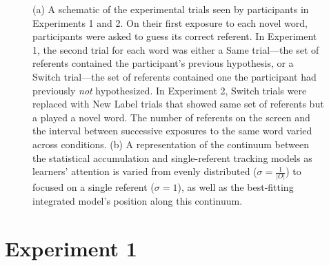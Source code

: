 \documentclass[man,floatsintext]{apa6}
\begin{document}
 \begin{figure}[!h]
	\caption{\label{fig:design} (a)  A schematic of the experimental trials seen by participants in Experiments 1 and 2. On their first exposure to each novel word, participants were asked to guess its correct referent. In Experiment 1, the second trial for each word was either a Same trial---the set of referents contained the participant's previous hypothesis, or a Switch trial---the set of referents contained one the participant had previously \emph{not} hypothesized. In Experiment 2, Switch trials were replaced with New Label trials that showed same set of referents but a played a novel word. The number of referents on the screen and the interval between successive exposures to the same word varied across conditions. (b) A representation of the continuum between the statistical accumulation and single-referent tracking models as learners' attention is varied from evenly distributed ($\sigma=\frac{1}{|O|}$) to focused on a single referent ($\sigma=1$), as well as the best-fitting integrated model's position along this continuum.}
\end{figure}

\section{Experiment 1}
\end{document}
